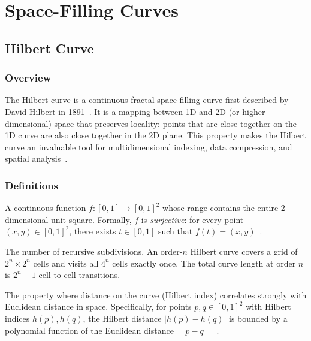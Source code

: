 \chapter{Space-Filling Curves}
\label{ch:space_filling_curves}

\section{Hilbert Curve}
\label{sec:hilbert_curve}

\subsection{Overview}
The Hilbert curve is a continuous fractal space-filling curve first described by David Hilbert in 1891~\cite{hilbert1891}. It is a mapping between 1D and 2D (or higher-dimensional) space that preserves locality: points that are close together on the 1D curve are also close together in the 2D plane. This property makes the Hilbert curve an invaluable tool for multidimensional indexing, data compression, and spatial analysis~\cite{sagan1994}.

\subsection{Definitions}
\begin{definition}\label{def:space_filling_curve}
A continuous function $f \colon [0,1] \to [0,1]^2$ whose range contains the entire 2-dimensional unit square. Formally, $f$ is \emph{surjective}: for every point $(x, y) \in [0,1]^2$, there exists $t \in [0,1]$ such that $f(t) = (x, y)$~\cite{sagan1994}.
\end{definition}

\begin{definition}[Order ($n$)]\label{def:hilbert_order}
The number of recursive subdivisions. An order-$n$ Hilbert curve covers a grid of $2^n \times 2^n$ cells and visits all $4^n$ cells exactly once. The total curve length at order $n$ is $2^n - 1$ cell-to-cell transitions.
\end{definition}

\begin{definition}\label{def:locality_preservation}
The property where distance on the curve (Hilbert index) correlates strongly with Euclidean distance in space. Specifically, for points $p, q \in [0,1]^2$ with Hilbert indices $h(p), h(q)$, the Hilbert distance $|h(p) - h(q)|$ is bounded by a polynomial function of the Euclidean distance $\|p - q\|$~\cite{moon2001}.
\end{definition}


